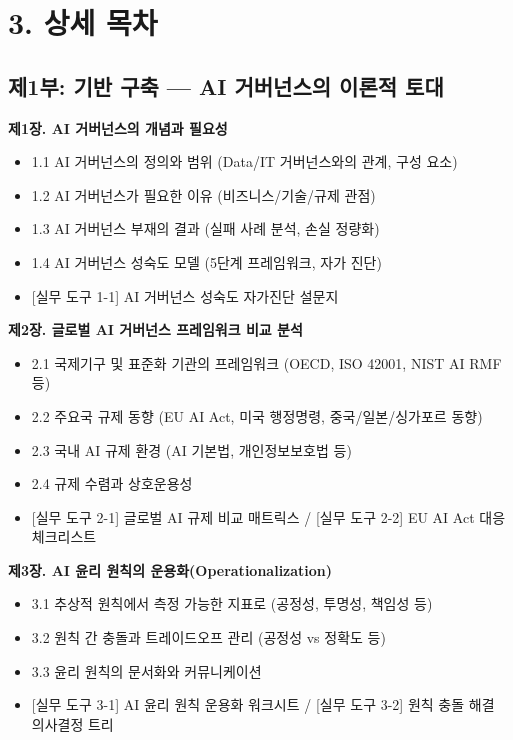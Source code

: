 \vspace{0.8cm}
\section*{3. 상세 목차}

\subsection*{제1부: 기반 구축 --- AI 거버넌스의 이론적 토대}

\textbf{제1장. AI 거버넌스의 개념과 필요성}
\begin{itemize}
 \item 1.1 AI 거버넌스의 정의와 범위 (Data/IT 거버넌스와의 관계, 구성 요소)
 \item 1.2 AI 거버넌스가 필요한 이유 (비즈니스/기술/규제 관점)
 \item 1.3 AI 거버넌스 부재의 결과 (실패 사례 분석, 손실 정량화)
 \item 1.4 AI 거버넌스 성숙도 모델 (5단계 프레임워크, 자가 진단)
 \item {[실무 도구 1-1] AI 거버넌스 성숙도 자가진단 설문지}
\end{itemize}

\medskip
\textbf{제2장. 글로벌 AI 거버넌스 프레임워크 비교 분석}
\begin{itemize}
 \item 2.1 국제기구 및 표준화 기관의 프레임워크 (OECD, ISO 42001, NIST AI RMF 등)
 \item 2.2 주요국 규제 동향 (EU AI Act, 미국 행정명령, 중국/일본/싱가포르 동향)
 \item 2.3 국내 AI 규제 환경 (AI 기본법, 개인정보보호법 등)
 \item 2.4 규제 수렴과 상호운용성
 \item {[실무 도구 2-1] 글로벌 AI 규제 비교 매트릭스} / {[실무 도구 2-2] EU AI Act 대응 체크리스트}
\end{itemize}

\medskip
\textbf{제3장. AI 윤리 원칙의 운용화(Operationalization)}
\begin{itemize}
 \item 3.1 추상적 원칙에서 측정 가능한 지표로 (공정성, 투명성, 책임성 등)
 \item 3.2 원칙 간 충돌과 트레이드오프 관리 (공정성 vs 정확도 등)
 \item 3.3 윤리 원칙의 문서화와 커뮤니케이션
 \item {[실무 도구 3-1] AI 윤리 원칙 운용화 워크시트} / {[실무 도구 3-2] 원칙 충돌 해결 의사결정 트리}
\end{itemize}

